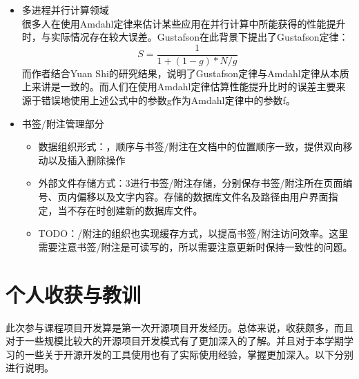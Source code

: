 \documentclass[a4paper,12pt]{article}
\begin{document}
\begin{CJK*}{UTF8}{song}
	\begin{itemize}
		\item{{多进程并行计算领域}\\很多人在使用Amdahl定律来估计某些应用在并行计算中所能获得的性能提升时，与实际情况存在较大误差。Gustafson在此背景下提出了Gustafson定律：\begin{displaymath}S=\frac{1}{1+(1-g)*N/g}\end{displaymath}而作者结合Yuan Shi的研究结果，说明了Gustafson定律与Amdahl定律从本质上来讲是一致的。而人们在使用Amdahl定律估算性能提升比时的误差主要来源于错误地使用上述公式中的参数g作为Amdahl定律中的参数f。}
		\item{{书签/附注管理部分}}
			\begin{itemize}
				\item{数据组织形式：，顺序与书签/附注在文档中的位置顺序一致，提供双向移动以及插入删除操作}
				\item{外部文件存储方式：3进行书签/附注存储，分别保存书签/附注所在页面编号、页内偏移以及文字内容。存储的数据库文件名及路径由用户界面指定，当不存在时创建新的数据库文件。}
				\item{TODO：/附注的组织也实现缓存方式，以提高书签/附注访问效率。这里需要注意书签/附注是可读写的，所以需要注意更新时保持一致性的问题。}
			\end{itemize}
	\end{itemize}

	\section{\large{个人收获与教训}}
	此次参与课程项目开发算是第一次开源项目开发经历。总体来说，收获颇多，而且对于一些规模比较大的开源项目开发模式有了更加深入的了解。并且对于本学期学习的一些关于开源开发的工具使用也有了实际使用经验，掌握更加深入。以下分别进行说明。


\end{CJK*}
\end{document}
